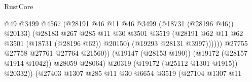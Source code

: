 \begin{lexlean}{RustCore}
\begin{coremodule}
                                                    @49
                                                    @3499
                                                    @4567
                                                    (@28191
                                                      @46
                                                      @11
                                                      @46
                                                      @3499
                                                      (@18731 (@28196 @46))
                                                      @20133)
                                                    (@28183
                                                      @267
                                                      @285
                                                      @11
                                                      @30
                                                      @3501
                                                      @3519
                                                      (@28191
                                                        @62
                                                        @11
                                                        @62
                                                        @3501
                                                        (@18731 (@28196 @62))
                                                        @20150)
                                                      (@19293 @28131 @3997))))))
                                            @27755
                                            @27758
                                            @27761
                                            @27764
                                            @21560))
                                        (@19147 (@28153 @190))
                                        (@19172 (@28157 @1914 @1042))
                                        @28059
                                        @28064)
                                      @20319
                                      (@19172 (@25112 @1301 @1915))
                                      @20332))
                                  (@27403
                                    @1307
                                    @285
                                    @11
                                    @30
                                    @6654
                                    @3519
                                    (@27104
                                      @1307
                                      @11

\end{coremodule}
\end{lexlean}

